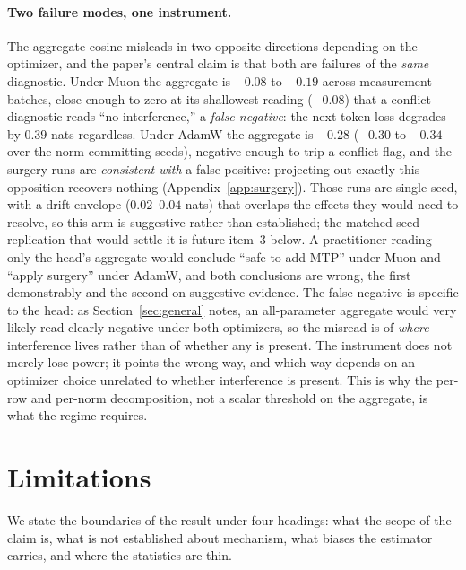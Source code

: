 \paragraph{Two failure modes, one instrument.} The aggregate cosine misleads in
two opposite directions depending on the optimizer, and the paper's central claim
is that both are failures of the \emph{same} diagnostic. Under Muon the aggregate
is ${-}0.08$ to ${-}0.19$ across measurement batches, close enough to zero at its shallowest reading (${-}0.08$) that a conflict diagnostic reads
``no interference,'' a \emph{false negative}: the next-token loss degrades by
$0.39$ nats regardless. Under AdamW the aggregate is ${-}0.28$ (${-}0.30$ to
${-}0.34$ over the norm-committing seeds), negative enough to trip a conflict flag,
and the surgery runs are \emph{consistent with} a false positive: projecting out
exactly this opposition recovers nothing (Appendix~\ref{app:surgery}). Those runs are
single-seed, with a drift envelope ($0.02$--$0.04$ nats) that overlaps the effects
they would need to resolve, so this arm is suggestive rather than established; the
matched-seed replication that would settle it is future item~3 below. A practitioner reading only the head's aggregate would conclude
``safe to add MTP'' under Muon and ``apply surgery'' under AdamW, and both
conclusions are wrong, the first demonstrably and the second on suggestive
evidence. The false negative is specific to the head: as
Section~\ref{sec:general} notes, an all-parameter aggregate would very
likely read clearly negative under both optimizers, so the misread is of
\emph{where} interference lives rather than of whether any is present. The instrument
does not merely lose power; it points the wrong way, and
which way depends on an optimizer choice unrelated to whether interference is
present. This is why the per-row and per-norm decomposition, not a scalar
threshold on the aggregate, is what the regime requires.

\section{Limitations}
\label{sec:limitations}
We state the boundaries of the result under four headings: what the scope of the
claim is, what is not established about mechanism, what biases the estimator
carries, and where the statistics are thin.

